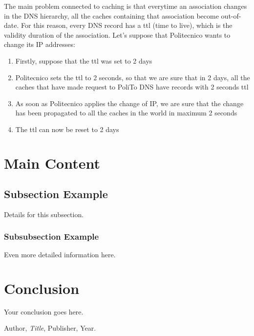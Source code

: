 The main problem connected to caching is that everytime an association changes in the DNS hierarchy, all the caches containing that association become out-of-date. For this reason, every DNS record has a ttl (time to live), which is the validity duration of the association. Let's suppose that Politecnico wants to change its IP addresses:
\begin{enumerate}
    \item Firstly, suppose that the ttl was set to 2 days
    \item Politecnico sets the ttl to 2 seconds, so that we are sure that in 2 days, all the caches that have made request to PoliTo DNS have records with 2 seconds ttl
    \item As soon as Politecnico applies the change of IP, we are sure that the change has been propagated to all the caches in the world in maximum 2 seconds
    \item The ttl can now be reset to 2 days
\end{enumerate}

\section{Main Content}
\subsection{Subsection Example}
Details for this subsection.

\subsubsection{Subsubsection Example}
Even more detailed information here.

\section{Conclusion}
Your conclusion goes here.

\begin{thebibliography}{9}
 Author, \textit{Title}, Publisher, Year.
\end{thebibliography}

